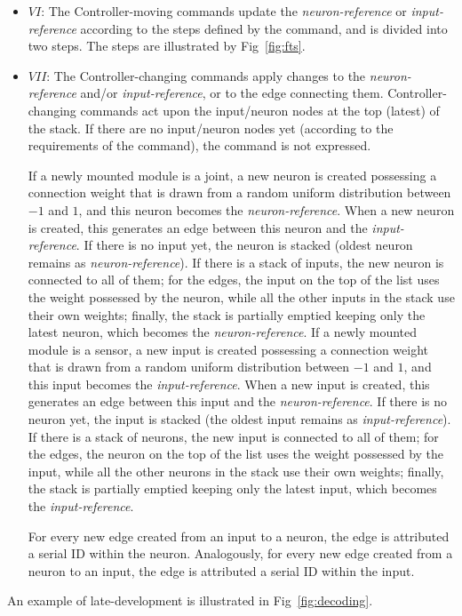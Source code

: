 \documentclass[utf8]{frontiersSCNS} %
\begin{document}
\begin{itemize}
 \item \textbf{$VI$}: The Controller-moving commands update the \textit{neuron-reference} or \textit{input-reference} according to the steps defined by the command, and is divided into two steps. The steps are illustrated by Fig~\ref{fig:fts}.  
 
 


 \item \textbf{$VII$}: The Controller-changing commands apply changes to the \textit{neuron-reference} and/or \textit{input-reference}, or to the edge connecting them. Controller-changing commands act upon the input/neuron nodes at the top (latest) of the stack. If there are no input/neuron nodes yet (according to the requirements of the command), the command is not expressed.
 
 If a newly mounted module is a joint, a new neuron is created possessing a connection weight that is drawn from a random uniform distribution between $-1$ and $1$, and this neuron becomes the \textit{neuron-reference}. When a new neuron is created, this generates an edge between this neuron and the \textit{input-reference}. If there is no input yet, the neuron is stacked (oldest neuron remains as \textit{neuron-reference}). If there is a stack of inputs, the new neuron is connected to all of them; for the edges, the input on the top of the list uses the weight possessed by the neuron, while all the other inputs in the stack use their own weights; finally, the stack is partially emptied keeping only the latest neuron, which becomes the \textit{neuron-reference}.
  If a newly mounted module is a sensor, a new input is created possessing a connection weight that is drawn from a random uniform distribution between $-1$ and $1$, and this input becomes the \textit{input-reference}. When a new input is created, this generates an edge between this input and the \textit{neuron-reference}. If there is no neuron yet, the input is stacked (the oldest input remains as \textit{input-reference}). If there is a stack of neurons, the new input is connected to all of them; for the edges, the neuron on the top of the list uses the weight possessed by the input, while all the other neurons in the stack use their own weights; finally, the stack is partially emptied keeping only the latest input, which becomes the \textit{input-reference}. 
 
 
For every new edge created from an input to a neuron, the edge is attributed a serial ID within the neuron. Analogously, for every new edge created from a neuron to an input, the edge is attributed a serial ID within the input. 
 
\end{itemize}
An example of late-development is illustrated in Fig~\ref{fig:decoding}.
 
\end{document}
